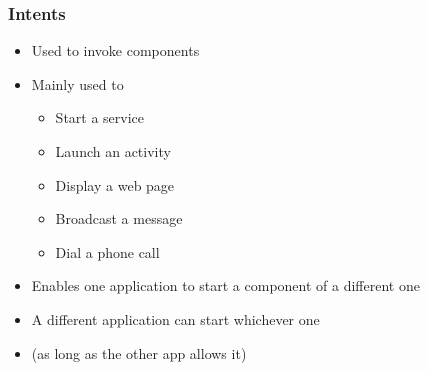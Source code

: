 %
%

\begin{frame}
  \frametitle{Intents}
  
  \begin{itemize}
  \item<1-> Used to invoke components
  
  \item<2->[] Mainly used to 
    \begin{itemize}
    \item<3-> Start a service
    \item<4-> Launch an activity
    \item<5-> Display a web page
    \item<6-> Broadcast a message
    \item<7-> Dial a phone call
    \end{itemize}
    
  \item<3-> Enables one application to start a component of a
    different one

  \item<4-> A different application can start whichever one
  \item<4->[] (as long as the other app allows it)


  \end{itemize}

\end{frame}


